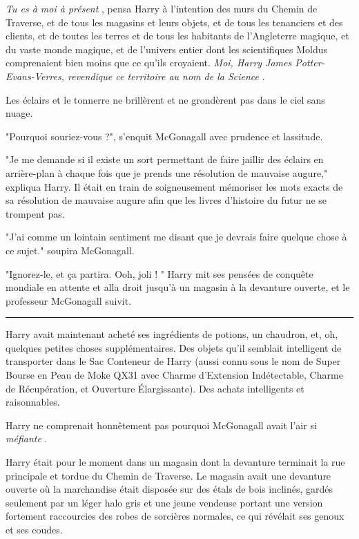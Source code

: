 \emph{Tu es à moi à présent} , pensa Harry à l'intention des murs du Chemin de Traverse, et de tous les magasins et leurs objets, et de tous les tenanciers et des clients, et de toutes les terres et de tous les habitants de l'Angleterre magique, et du vaste monde magique, et de l'univers entier dont les scientifiques Moldus comprenaient bien moins que ce qu'ils croyaient. \emph{Moi, Harry James Potter-Evans-Verres, revendique ce territoire au nom de la Science} .

Les éclairs et le tonnerre ne brillèrent et ne grondèrent pas dans le ciel sans nuage.

"Pourquoi souriez-vous ?", s'enquit McGonagall avec prudence et lassitude.

"Je me demande si il existe un sort permettant de faire jaillir des éclairs en arrière-plan à chaque fois que je prends une résolution de mauvaise augure," expliqua Harry. Il était en train de soigneusement mémoriser les mots exacts de sa résolution de mauvaise augure afin que les livres d'histoire du futur ne se trompent pas.

"J'ai comme un lointain sentiment me disant que je devrais faire quelque chose à ce sujet." soupira McGonagall.

"Ignorez-le, et ça partira. Ooh, joli ! " Harry mit ses pensées de conquête mondiale en attente et alla droit jusqu'à un magasin à la devanture ouverte, et le professeur McGonagall suivit.
\par\noindent\rule{\textwidth}{0.4pt}
Harry avait maintenant acheté ses ingrédients de potions, un chaudron, et, oh, quelques petites choses supplémentaires. Des objets qu'il semblait intelligent de transporter dans le Sac Conteneur de Harry (aussi connu sous le nom de Super Bourse en Peau de Moke QX31 avec Charme d'Extension Indétectable, Charme de Récupération, et Ouverture Élargissante). Des achats intelligents et raisonnables.

Harry ne comprenait honnêtement pas pourquoi McGonagall avait l'air si \emph{méfiante} .

Harry était pour le moment dans un magasin dont la devanture terminait la rue principale et tordue du Chemin de Traverse. Le magasin avait une devanture ouverte où la marchandise était disposée sur des étals de bois inclinés, gardés seulement par un léger halo gris et une jeune vendeuse portant une version fortement raccourcies des robes de sorcières normales, ce qui révélait ses genoux et ses coudes.

